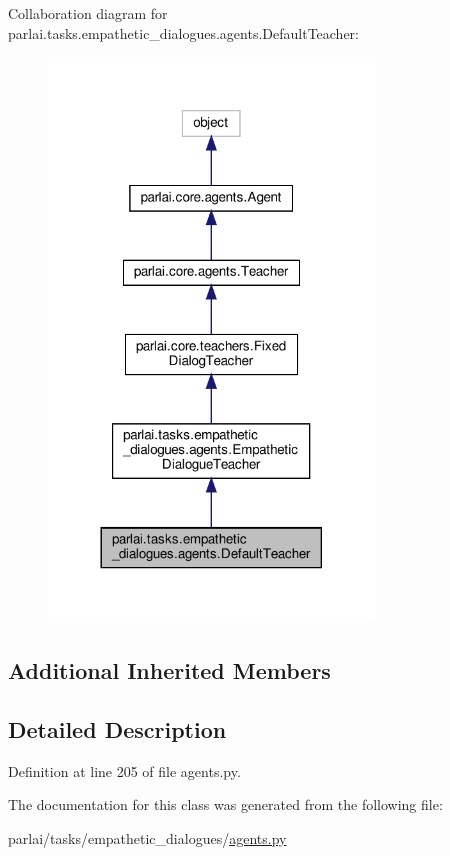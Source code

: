 Collaboration diagram for parlai.\+tasks.\+empathetic\+\_\+dialogues.\+agents.\+Default\+Teacher\+:
\nopagebreak
\begin{figure}[H]
\begin{center}
\leavevmode
\includegraphics[width=245pt]{classparlai_1_1tasks_1_1empathetic__dialogues_1_1agents_1_1DefaultTeacher__coll__graph}
\end{center}
\end{figure}
\subsection*{Additional Inherited Members}


\subsection{Detailed Description}


Definition at line 205 of file agents.\+py.



The documentation for this class was generated from the following file\+:\begin{DoxyCompactItemize}
\item 
parlai/tasks/empathetic\+\_\+dialogues/\hyperlink{parlai_2tasks_2empathetic__dialogues_2agents_8py}{agents.\+py}\end{DoxyCompactItemize}
